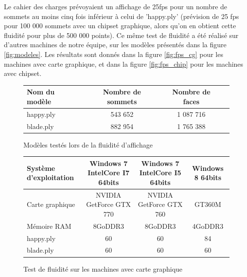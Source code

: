 Le cahier des charges prévoyaient un affichage de 25fps pour un nombre de sommets au moins cinq fois inférieur à celui de 'happy.ply' (prévision de 25 fps pour 100 000 sommets avec un chipset graphique, alors qu'on en obtient cette fluidité pour plus de 500 000 points). Ce même test de fluidité a été réalisé sur d'autres machines de notre équipe, sur les modèles présentés dans la figure \ref{fig:modeles}. Les résultats sont donnés dans la figure \ref{fig:fps_cg} pour les machines avec carte graphique, et dans la figure \ref{fig:fps_chip} pour les machines avec chipset.

\begin{figure}[h]
  \begin{changemargin}{-4cm}{-4cm}
    \centering
    \begin{tabular}{|l|c|c|c|}
      \hline
      Nom du modèle & Nombre de sommets & Nombre de faces \\ \hline
      happy.ply & 543 652 & 1 087 716 \\ \hline
      blade.ply & 882 954 & 1 765 388 \\ \hline
    \end{tabular}
  \end{changemargin}
  \caption{Modèles testés lors de la fluidité d'affichage}
  \label{tab:modeles}
\end{figure}

\begin{figure}[h]
  \begin{changemargin}{-4cm}{-4cm}
    \centering
    \begin{tabular}{|l|c|c|c|}
      \hline
      Système d'exploitation & Windows 7 IntelCore I7 64bits & Windows 7 IntelCore I5 64bits & Windows 8 64bits\\ \hline
      Carte graphique &  NVIDIA GetForce GTX 770 & NVIDIA GetForce GTX 760 & GT360M \\ \hline
      Mémoire RAM & 8GoDDR3 & 8GoDDR3 & 4GoDDR3 \\ \hline \hline
      happy.ply & 60 & 60 & 84 \\ \hline
      blade.ply & 60 & 60 & 60\\ \hline
    \end{tabular}
  \end{changemargin}
  \caption{Test de fluidité sur les machines avec carte graphique}
  \label{tab:fps_cg}
\end{figure}


